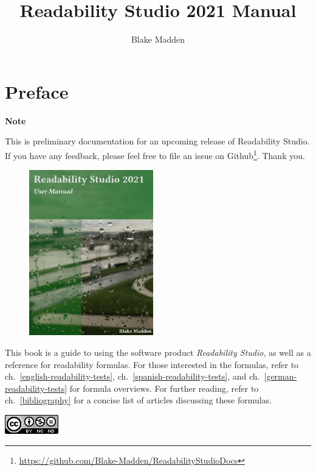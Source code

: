 \documentclass[
]{book}
\title{Readability Studio 2021 Manual}
\author{Blake Madden}
\date{}
\DeclareRobustCommand{\href}[2]{#2\footnote{\url{#1}}}
\newenvironment{notesection}
    {
    \begin{tcolorbox}[colframe=mediumblue,colback=lightblue,coltext=mediumblue,arc=3mm]
    \faLightbulb[regular] \textbf{Note} \newline
    }
    {
    \end{tcolorbox}
    }
\theoremstyle{definition}
\theoremstyle{definition}
\theoremstyle{definition}
\theoremstyle{definition}
\theoremstyle{remark}
\begin{document}
\maketitle

{
\setcounter{tocdepth}{1}
\tableofcontents
}
\listoftables
\listoffigures
{}
\hypertarget{cover}{%
\chapter*{Preface}\label{cover}}

\begin{notesection}
This is preliminary documentation for an upcoming release of Readability
Studio. If you have any feedback, please feel free to file an issue on
\href{https://github.com/Blake-Madden/ReadabilityStudioDocs}{Github}.
Thank you.
\end{notesection}

\begin{figure}
\includegraphics[width=0.48\textwidth,height=\textheight]{images/NonGenerated/cover.png}

\end{figure}

This book is a guide to using the software product \emph{Readability Studio}, as well as a reference for readability formulas. For those interested in the formulas, refer to ch.~\ref{english-readability-tests}, ch.~\ref{spanish-readability-tests}, and ch.~\ref{german-readability-tests} for formula overviews. For further reading, refer to ch.~\ref{bibliography} for a concise list of articles discussing these formulas.

\includegraphics{images/NonGenerated/CC_BY-NC-ND.png}
\end{document}
